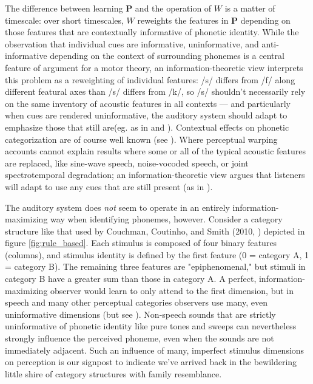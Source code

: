 \begin{multicols}{2}
The difference between learning $\mathbf{P}$ and the operation of $W$ is a matter of timescale: over short timescales, $W$ reweights the features in $\mathbf{P}$ depending on those features that are contextually informative of phonetic identity. While the observation that individual cues are informative, uninformative, and anti-informative depending on the context of surrounding phonemes is a central feature of argument for a motor theory\cite{Bailey1980}, an information-theoretic view interprets this problem as a reweighting of individual features: /s/ differs from /f/ along different featural axes than /s/ differs from /k/, so /s/ shouldn't necessarily rely on the same inventory of acoustic features in all contexts --- and particularly when cues are rendered uninformative, the auditory system should adapt to emphasize those that still are(eg. as in \cite{kiefteAbsorptionReliableSpectral2008} and \cite{kleinschmidtRobustSpeechPerception2015a}). Contextual effects on phonetic categorization are of course well known (see \cite{holtSpeechPerceptionCategorization2010a}). Where perceptual warping accounts cannot explain results where some or all of the typical acoustic features are replaced, like sine-wave speech\cite{remezSpeechPerceptionTraditional1981}, noise-vocoded speech\cite{davisLexicalInformationDrives2005}, or joint spectrotemporal degradation\cite{elliottModulationTransferFunction2009a}; an information-theoretic view argues that listeners will adapt to use any cues that are still present (as in \cite{kiefteAbsorptionReliableSpectral2008}). 

The auditory system does \textit{not} seem to operate in an entirely information-maximizing way when identifying phonemes, however. Consider a category structure like that used by Couchman, Coutinho, and Smith (2010, \cite{couchmanRulesResemblanceTheir2010}) depicted in figure \ref{fig:rule_based}. Each stimulus is composed of four binary features (columns), and stimulus identity is defined by the first feature (0 = category A, 1 = category B). The remaining three features are "epiphenomenal," but stimuli in category B have a greater sum than those in category A. A perfect, information-maximizing observer would learn to only attend to the first dimension, but in speech and many other perceptual categories observers use many, even uninformative dimensions\cite{couchmanRulesResemblanceTheir2010,roschFamilyResemblancesStudies1975} (but see \cite{leaUseMultipleDimensions2008}). Non-speech sounds that are strictly uninformative of phonetic identity like pure tones and sweeps can nevertheless strongly influence the perceived phoneme\cite{holtNeighboringSpectralContent2000,holtMeanMattersEffects2006}, even when the sounds are not immediately adjacent\cite{holtTemporallyNonadjacentNonlinguistic2005}. Such an influence of many, imperfect stimulus dimensions on perception is our signpost to indicate we've arrived back in the bewildering little shire of category structures with family resemblance.


\end{multicols}
